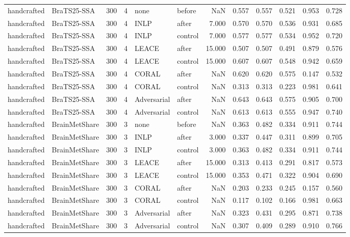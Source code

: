 \begin{tabular}{llrrllrrrrrr}
handcrafted & BraTS25-SSA & 300 & 4 & none & before & NaN & 0.557 & 0.557 & 0.521 & 0.953 & 0.728 \\
handcrafted & BraTS25-SSA & 300 & 4 & INLP & after & 7.000 & 0.570 & 0.570 & 0.536 & 0.931 & 0.685 \\
handcrafted & BraTS25-SSA & 300 & 4 & INLP & control & 7.000 & 0.577 & 0.577 & 0.534 & 0.952 & 0.720 \\
handcrafted & BraTS25-SSA & 300 & 4 & LEACE & after & 15.000 & 0.507 & 0.507 & 0.491 & 0.879 & 0.576 \\
handcrafted & BraTS25-SSA & 300 & 4 & LEACE & control & 15.000 & 0.607 & 0.607 & 0.548 & 0.942 & 0.659 \\
handcrafted & BraTS25-SSA & 300 & 4 & CORAL & after & NaN & 0.620 & 0.620 & 0.575 & 0.147 & 0.532 \\
handcrafted & BraTS25-SSA & 300 & 4 & CORAL & control & NaN & 0.313 & 0.313 & 0.223 & 0.981 & 0.641 \\
handcrafted & BraTS25-SSA & 300 & 4 & Adversarial & after & NaN & 0.643 & 0.643 & 0.575 & 0.905 & 0.700 \\
handcrafted & BraTS25-SSA & 300 & 4 & Adversarial & control & NaN & 0.613 & 0.613 & 0.555 & 0.947 & 0.740 \\
handcrafted & BrainMetShare & 300 & 3 & none & before & NaN & 0.363 & 0.482 & 0.334 & 0.911 & 0.744 \\
handcrafted & BrainMetShare & 300 & 3 & INLP & after & 3.000 & 0.337 & 0.447 & 0.311 & 0.899 & 0.705 \\
handcrafted & BrainMetShare & 300 & 3 & INLP & control & 3.000 & 0.363 & 0.482 & 0.334 & 0.911 & 0.744 \\
handcrafted & BrainMetShare & 300 & 3 & LEACE & after & 15.000 & 0.313 & 0.413 & 0.291 & 0.817 & 0.573 \\
handcrafted & BrainMetShare & 300 & 3 & LEACE & control & 15.000 & 0.353 & 0.471 & 0.322 & 0.904 & 0.690 \\
handcrafted & BrainMetShare & 300 & 3 & CORAL & after & NaN & 0.203 & 0.233 & 0.245 & 0.157 & 0.560 \\
handcrafted & BrainMetShare & 300 & 3 & CORAL & control & NaN & 0.117 & 0.102 & 0.166 & 0.981 & 0.663 \\
handcrafted & BrainMetShare & 300 & 3 & Adversarial & after & NaN & 0.323 & 0.431 & 0.295 & 0.871 & 0.738 \\
handcrafted & BrainMetShare & 300 & 3 & Adversarial & control & NaN & 0.307 & 0.409 & 0.289 & 0.910 & 0.766 \\

\end{tabular}
